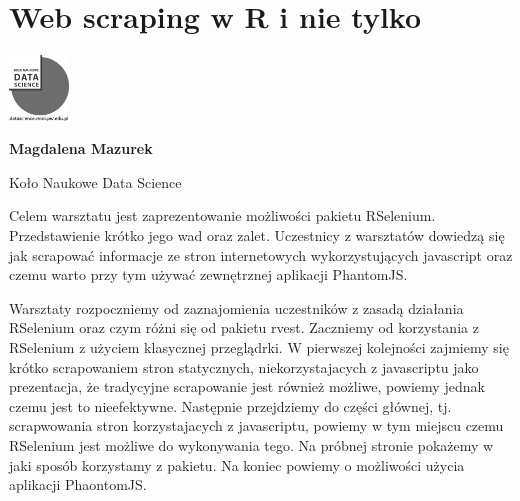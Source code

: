 \documentclass[\main/boa.tex]{subfiles}
\begin{document}
\section{Web scraping w R i nie tylko}
\begin{minipage}[t]{0.915\textwidth}
	\center     
    \includegraphics[width=60px]{img/workshops/czarno_biale/knds_logo.png} 
\end{minipage}

\begin{minipage}{0.915\textwidth}
\centering
{\bf {} Magdalena Mazurek}
\end{minipage}

\vskip 0.3cm

\begin{affiliations}
\begin{minipage}{0.915\textwidth}
\centering
\large Koło Naukowe Data Science  \\[2pt]
\end{minipage}
\end{affiliations}

\vskip 0.8cm

\opiswarsztatu Celem warsztatu jest zaprezentowanie możliwości pakietu RSelenium. Przedstawienie krótko jego wad oraz zalet. Uczestnicy z warsztatów dowiedzą się jak scrapować informacje ze stron internetowych wykorzystujących javascript oraz czemu warto przy tym używać zewnętrznej aplikacji PhantomJS.

\planwarsztatu
Warsztaty rozpoczniemy od zaznajomienia uczestników z zasadą działania RSelenium oraz czym różni się od pakietu rvest. Zaczniemy od korzystania z RSelenium z użyciem klasycznej przeglądrki. W pierwszej kolejności zajmiemy się krótko scrapowaniem stron statycznych, niekorzystajacych z javascriptu jako prezentacja, że tradycyjne scrapowanie jest również możliwe, powiemy jednak czemu jest to nieefektywne. Następnie przejdziemy do części głównej, tj. scrapwowania stron korzystajacych z javascriptu, powiemy w tym miejscu czemu RSelenium jest możliwe do wykonywania tego. Na próbnej stronie pokażemy w jaki sposób korzystamy z pakietu. Na koniec powiemy o możliwości użycia aplikacji PhaontomJS.	 
\end{document}
